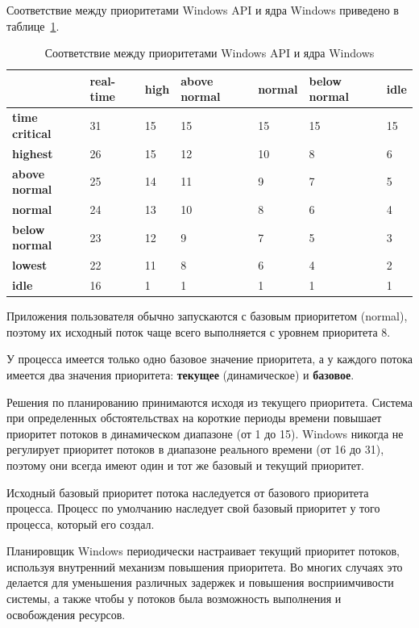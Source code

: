Соответствие между приоритетами Windows API и ядра Windows приведено в таблице~\ref{tbl:priority}.
\begin{table}[h]
	\caption{Соответствие между приоритетами Windows API и ядра Windows}
	\begin{center}
		\begin{tabular}{|l|p{45pt}|p{45pt}|p{45pt}|p{45pt}|p{45pt}|p{45pt}|} 
			\hline
			{} & \textbf{real-time} & \textbf{high} & \textbf{above normal} & \textbf{normal} & \textbf{below normal} & \textbf{idle}\\
			\hline
			\textbf{time critical} & 31 & 15 & 15 & 15 & 15 & 15 \\
			\hline
			\textbf{highest} & 26 & 15 & 12 & 10 & 8 & 6 \\
			\hline
			\textbf{above normal} & 25 & 14 & 11 & 9 & 7 & 5 \\
			\hline
			\textbf{normal} & 24 & 13 & 10 & 8 & 6 & 4 \\
			\hline
			\textbf{below normal} & 23 & 12 & 9 & 7 & 5 & 3 \\
			\hline
			\textbf{lowest} & 22 & 11 & 8 & 6 & 4 & 2 \\
			\hline
			\textbf{idle} & 16 & 1 & 1 & 1 & 1 & 1 \\
			\hline
		\end{tabular}
	\end{center}
	\label{tbl:priority}
\end{table}

Приложения пользователя обычно запускаются с базовым приоритетом (normal), поэтому их исходный поток чаще всего выполняется с уровнем приоритета 8. 

У процесса имеется только одно базовое значение приоритета, а у каждого потока имеется два значения приоритета: \textbf{текущее} (динамическое) и \textbf{базовое}. 

Решения по планированию принимаются исходя из текущего приоритета. 
Система при определенных обстоятельствах на короткие периоды времени повышает приоритет потоков в динамическом диапазоне (от 1 до 15). 
Windows никогда не регулирует приоритет потоков в диапазоне реального времени (от 16 до 31), поэтому они всегда имеют один и тот же базовый и текущий приоритет.

Исходный базовый приоритет потока наследуется от базового приоритета процесса. Процесс по умолчанию наследует свой базовый приоритет у того процесса, который его создал.

Планировщик Windows периодически настраивает текущий приоритет потоков, используя внутренний механизм повышения приоритета. 
Во многих случаях это делается для уменьшения различных задержек и повышения восприимчивости системы, а также чтобы у потоков была возможность выполнения и освобождения ресурсов.  

